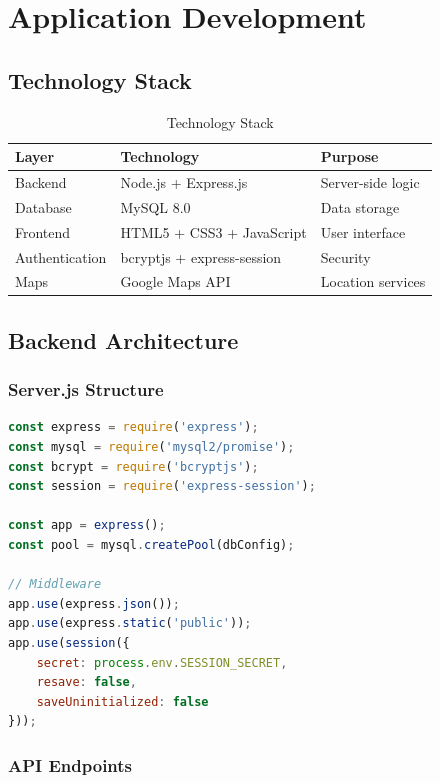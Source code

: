 \documentclass[12pt,a4paper]{report}
\begin{document}
\chapter{Application Development}

\section{Technology Stack}

\begin{table}[H]
\centering
\caption{Technology Stack}
\begin{tabular}{|l|l|l|}
\hline
\textbf{Layer} & \textbf{Technology} & \textbf{Purpose} \\
\hline
Backend & Node.js + Express.js & Server-side logic \\
Database & MySQL 8.0 & Data storage \\
Frontend & HTML5 + CSS3 + JavaScript & User interface \\
Authentication & bcryptjs + express-session & Security \\
Maps & Google Maps API & Location services \\
\hline
\end{tabular}
\end{table}

\section{Backend Architecture}

\subsection{Server.js Structure}

\begin{lstlisting}[language=JavaScript, caption={Express server setup}]
const express = require('express');
const mysql = require('mysql2/promise');
const bcrypt = require('bcryptjs');
const session = require('express-session');

const app = express();
const pool = mysql.createPool(dbConfig);

// Middleware
app.use(express.json());
app.use(express.static('public'));
app.use(session({
    secret: process.env.SESSION_SECRET,
    resave: false,
    saveUninitialized: false
}));
\end{lstlisting}

\subsection{API Endpoints}
\end{document}
